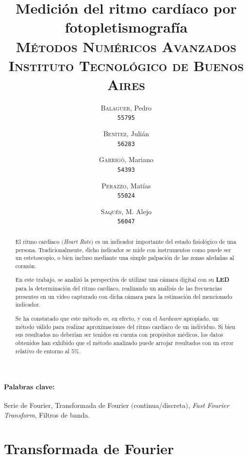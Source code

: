 \documentclass[12pt, twocolumn]{article}
\begin{document}
	\title{Medición del ritmo cardíaco por fotopletismografía\\ 
		   \large{\textsc{Métodos Numéricos Avanzados}} \\
		   \normalsize{\textsc{Instituto Tecnológico de Buenos Aires}}}
	\author{
		\textsc{Balaguer}, Pedro \\
		\texttt{55795}
		\and
		\textsc{Benítez}, Julián \\
		\texttt{56283}
		\and
		\textsc{Garrigó}, Mariano \\
		\texttt{54393}
		\and
		\textsc{Perazzo}, Matías \\
		\texttt{55024}
		\and
		\textsc{Saqués}, M. Alejo \\
		\texttt{56047} 
	}
	\date{}
	\maketitle
	
	\begin{abstract}
		
		El ritmo cardíaco $($\textit{Heart Rate}$)$ es un indicador importante del estado fisiológico de una persona. Tradicionalmente, dicho indicador se mide con instrumentos como puede ser un estetoscopio, o bien incluso mediante una simple palpación de las zonas aledañas al corazón.
		
		En este trabajo, se analizó la perspectiva de utilizar una cámara digital con su \textbf{LED} para la determinación del ritmo cardíaco, realizando un análisis de las frecuencias presentes en un vídeo capturado con dicha cámara para la estimación del mencionado indicador.
		
		Se ha constatado que este método es, en efecto, y con el \textit{hardware} apropiado, un método válido para realizar aproximaciones del ritmo cardíaco de un individuo. Si bien sus resultados no deberían ser tenidos en cuenta con propósitos médicos, los datos obtenidos han exhibido que el método analizado puede arrojar resultados con un error relativo de entorno al $5\%$.
		

	\end{abstract}
	
	\paragraph{Palabras clave:} Serie de Fourier, Transformada de Fourier $($continua/discreta$)$, \textit{Fast Fourier Transform}, Filtros de banda.
	
	\section{Transformada de Fourier}
	
\end{document}
